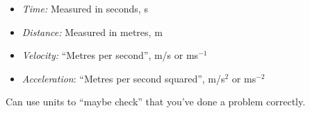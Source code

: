 \documentclass[10pt]{scrartcl}
\begin{document}
\begin{definition}[SI Units]\begin{itemize}
\item \emph{Time:} Measured in seconds, s

\item \emph{Distance:} Measured in metres, m

\item \emph{Velocity:} ``Metres per second'', m/s or ms$^{-1}$
	
\item \emph{Acceleration}: ``Metres per second squared'', m/s$^2$ or ms$^{-2}$
\end{itemize}
\end{definition}\vsp

Can use units to ``maybe check'' that you've done a problem correctly.\\
\end{document}
